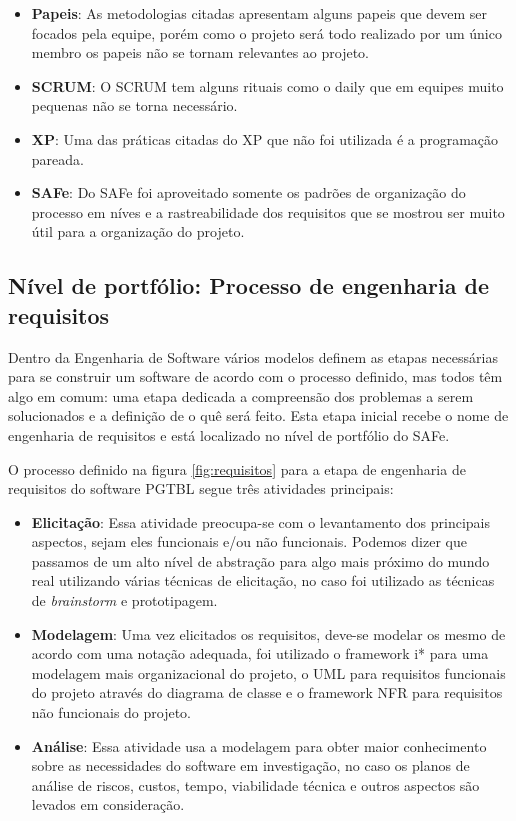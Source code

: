 \begin{itemize}
  \item \textbf{Papeis}: As metodologias citadas apresentam alguns papeis que devem ser focados pela equipe, porém
    como o projeto será todo realizado por um único membro os papeis não se tornam relevantes ao projeto.
  \item \textbf{SCRUM}: O SCRUM tem alguns rituais como o daily que em equipes muito pequenas não se torna necessário.
  \item \textbf{XP}: Uma das práticas citadas do XP que não foi utilizada é a programação pareada.
  \item \textbf{SAFe}: Do SAFe foi aproveitado somente os padrões de organização do processo em níves e a rastreabilidade dos requisitos que se mostrou ser muito útil para a organização do projeto.
\end{itemize}

\subsection{Nível de portfólio: Processo de engenharia de requisitos}

Dentro da Engenharia de Software vários modelos definem as etapas necessárias para se construir um software de acordo com o processo definido, mas todos têm algo em comum: uma etapa dedicada a compreensão dos problemas a serem solucionados e a definição de o quê será feito. Esta etapa inicial recebe o nome de engenharia de requisitos e está localizado no nível de portfólio do SAFe.

O processo definido na figura \ref{fig:requisitos} para a etapa de engenharia de requisitos do software PGTBL segue três atividades principais:

\begin{itemize}
  \item \textbf{Elicitação}: Essa atividade preocupa-se com o levantamento dos principais aspectos, sejam eles funcionais e/ou não funcionais. Podemos dizer que passamos de um alto nível de abstração para algo mais próximo do mundo real utilizando várias técnicas de elicitação, no caso foi utilizado as técnicas de \textit{brainstorm} e prototipagem.
  \item \textbf{Modelagem}: Uma vez elicitados os requisitos, deve-se modelar os mesmo de acordo com uma notação adequada, foi utilizado o framework i* para uma modelagem mais organizacional do projeto, o UML para requisitos funcionais do projeto através do diagrama de classe e o framework NFR para requisitos não funcionais do projeto.
  \item \textbf{Análise}: Essa atividade usa a modelagem para obter maior conhecimento sobre as necessidades do software em investigação, no caso os planos de análise de riscos, custos, tempo, viabilidade técnica e outros aspectos são levados em
consideração.
\end{itemize}

